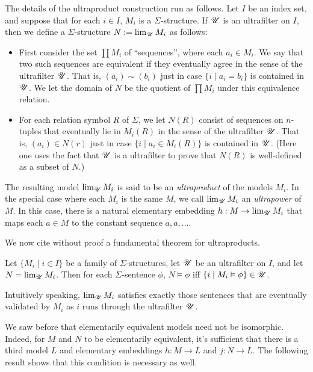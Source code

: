 The details of the ultraproduct construction run as follows.  Let $I$
be an index set, and suppose that for each $i\in I$, $M_i$ is a
$\Sigma$-structure.  If $\mathscr U$ is an ultrafilter on $I$, then we define
a $\Sigma$-structure $N:=\lim _{\mathscr U}M_i$ as follows:
\begin{itemize}
\item First consider the set $\prod M_i$ of ``sequences'', where each
  $a_i\in M_i$.  We say that two such sequences are equivalent if they
  eventually agree in the sense of the ultrafilter $\mathscr U$.  That is,
  $(a_i)\sim (b_i)$ just in case $\{ i\mid a_i=b_i\}$ is contained in
  $\mathscr U$.  We let the domain of $N$ be the quotient of $\prod M_i$
  under this equivalence relation.
\item For each relation symbol $R$ of $\Sigma$, we let $N(R)$ consist
  of sequences on $n$-tuples that eventually lie in $M_i(R)$ in the
  sense of the ultrafilter $\mathscr U$.  That is, $(a_i)\in N( r)$ just in
  case $\{ i\mid a_i\in M_i(R)\}$ is contained in $\mathscr U$.  (Here one
  uses the fact that $\mathscr U$ is a ultrafilter to prove that $N(R)$ is
  well-defined as a subset of $N$.)
\end{itemize}
The resulting model $\lim _{\mathscr U}M_i$ is said to be an
\emph{ultraproduct} of the models $M_i$.  In the special case where
each $M_i$ is the same $M$, we call $\lim _{\mathscr U}M_i$ an
\emph{ultrapower} of $M$.  In this case, there is a natural elementary
embedding $h:M\to \lim _{\mathscr U}M_i$ that maps each $a\in M$ to the
constant sequence $a,a,\dots $.

We now cite without proof a fundamental theorem for ultraproducts.

\begin{thm}[{\L}os] Let $\{ M_i\mid i\in I\}$ be a family of
  $\Sigma$-structures, let $\mathscr U$ be an ultrafilter on $I$, and let
  $N=\lim _{\mathscr U}M_i$.  Then for each $\Sigma$-sentence $\phi$,
  $N\vDash \phi$ iff $\{ i \mid M_i\vDash \phi \}\in \mathscr U$. \end{thm}
Intuitively speaking, $\lim _{\mathscr U}M_i$ satisfies exactly those
sentences that are eventually validated by $M_i$ as $i$ runs through
the ultrafilter $\mathscr U$.



We saw before that elementarily equivalent models need not be
isomorphic.  Indeed, for $M$ and $N$ to be elementarily equivalent,
it's sufficient that there is a third model $L$ and elementary
embeddings $h:M\to L$ and $j:N\to L$.  The following result shows that
this condition is necessary as well. 

